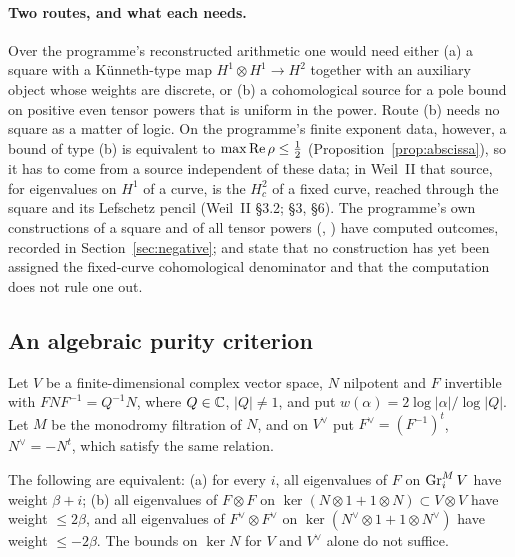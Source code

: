 \paragraph{Two routes, and what each needs.}
Over the programme's reconstructed arithmetic one would need either (a) a square with a Künneth-type map $H^1\otimes H^1\to H^2$ together with an auxiliary object whose weights are discrete, or (b) a cohomological source for a pole bound on positive even tensor powers that is uniform in the power.
Route (b) needs no square as a matter of logic. On the programme's finite exponent data, however, a bound of type (b) is equivalent to $\max\operatorname{Re}\rho\le\tfrac12$ (Proposition~\ref{prop:abscissa}), so it has to come from a source independent of these data; in Weil~II that source, for eigenvalues on $H^1$ of a curve, is the $H^2_c$ of a fixed curve, reached through the square and its Lefschetz pencil (Weil~II §3.2;  §3,  §6).
The programme's own constructions of a square and of all tensor powers (, ) have computed outcomes, recorded in Section~\ref{sec:negative};  and  state that no construction has yet been assigned the fixed-curve cohomological denominator and that the computation does not rule one out.

\subsection{An algebraic purity criterion}

Let $V$ be a finite-dimensional complex vector space, $N$ nilpotent and $F$ invertible with $FNF^{-1}=Q^{-1}N$, where $Q\in\mathbb{C}$, $|Q|\ne1$, and put $w(\alpha)=2\log|\alpha|/\log|Q|$. Let $M$ be the monodromy filtration of $N$, and on $V^\vee$ put $F^\vee=(F^{-1})^t$, $N^\vee=-N^t$, which satisfy the same relation.

\begin{proposition}\label{prop:purity}
The following are equivalent:
(a) for every $i$, all eigenvalues of $F$ on $\operatorname{Gr}^M_iV$ have weight $\beta+i$;
(b) all eigenvalues of $F\otimes F$ on $\ker(N\otimes1+1\otimes N)\subset V\otimes V$ have weight $\le2\beta$, and all eigenvalues of $F^\vee\otimes F^\vee$ on $\ker(N^\vee\otimes1+1\otimes N^\vee)$ have weight $\le-2\beta$.
The bounds on $\ker N$ for $V$ and $V^\vee$ alone do not suffice.
\end{proposition}

